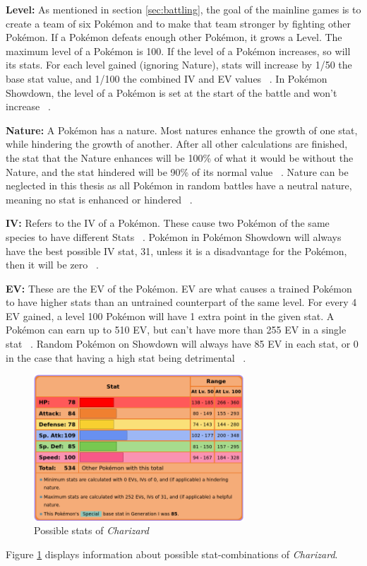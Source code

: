 \textbf{Level:} As mentioned in section \ref{sec:battling}, the goal of the mainline games is to create 
a team of six Pokémon and to make that team stronger by fighting other Pokémon. If a Pokémon defeats
enough other Pokémon, it grows a Level. The maximum level of a Pokémon is 100. If the level of a Pokémon
increases, so will its stats. For each level gained (ignoring Nature), stats will increase by 1/50 the
base stat value, and 1/100 the combined \ac{IV} and \ac{EV} values ~\autocite{Bulbapedia:Stat}. 
In Pokémon Showdown, the level of  a Pokémon is set at the start of the battle and won't 
increase ~\autocite{Smogon:RandBatsGuide}.

\textbf{Nature:} A Pokémon has a nature. Most natures enhance the growth of one stat, while hindering
the growth of another. After all other calculations are finished, the stat that the Nature enhances will
be 100\% of what it would be without the Nature, and the stat hindered will be 90\% of its normal value
~\autocite{Bulbapedia:Stat}. Nature can be neglected in this thesis as all Pokémon in random battles have
a neutral nature, meaning no stat is enhanced or hindered ~\autocite{Smogon:RandBatsGuide}.

\textbf{IV:} Refers to the \ac{IV} of a Pokémon. These cause two Pokémon of the same species to have
different Stats ~\autocite{Bulbapedia:Stat}. Pokémon in Pokémon Showdown will always have the best possible \ac{IV} 
stat, 31, unless it is a disadvantage for the Pokémon, then it will be zero ~\autocite{Smogon:RandBatsGuide}.

\textbf{EV:} These are the \ac{EV} of the Pokémon. \ac{EV} are what causes a trained Pokémon to have higher
stats than an untrained counterpart of the same level. For every 4 \ac{EV} gained, a level 100 Pokémon 
will have 1 extra point in the given stat. A Pokémon can earn up to 510 \ac{EV}, but can't have more than
255 \ac{EV} in a single stat ~\autocite{Bulbapedia:Stat}. Random Pokémon on Showdown will always have 85 
\ac{EV} in each stat, or 0 in the case that having a high stat being detrimental ~\autocite{Smogon:RandBatsGuide}.

\begin{figure}[h]
	\centering
	\includegraphics[width=0.7\textwidth]{images/charizard-stats.png}
	\caption{Possible stats of \textit{Charizard} ~\autocite{Bulbapedia:Charizard}}
	\label{fig:charizard-stats}
\end{figure}
Figure \ref{fig:charizard-stats} displays information about possible stat-combinations of 
\textit{Charizard}. 

